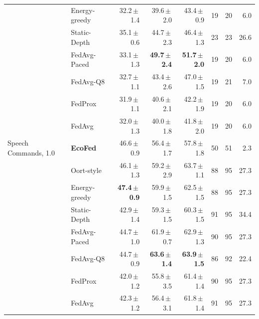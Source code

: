 \begin{tabular}{@{}llrrrrrr@{}}
 & Energy-greedy & 32.2\,$\pm$\,1.4 & 39.6\,$\pm$\,2.0 & 43.4\,$\pm$\,0.9 & 19 & 20 & 6.0\\
 & Static-Depth & 35.1\,$\pm$\,0.6 & 44.7\,$\pm$\,2.3 & 46.4\,$\pm$\,1.3 & 23 & 23 & 26.6\\
 & FedAvg-Paced & 33.1\,$\pm$\,1.3 & \textbf{49.7\,$\pm$\,2.4} & \textbf{51.7\,$\pm$\,2.0} & 19 & 20 & 6.0\\
 & FedAvg-Q8 & 32.7\,$\pm$\,1.1 & 43.4\,$\pm$\,2.6 & 47.0\,$\pm$\,1.5 & 19 & 21 & 7.0\\
 & FedProx & 31.9\,$\pm$\,1.1 & 40.6\,$\pm$\,2.1 & 42.2\,$\pm$\,1.9 & 19 & 20 & 6.0\\
 & FedAvg & 32.0\,$\pm$\,1.3 & 40.0\,$\pm$\,1.8 & 41.8\,$\pm$\,2.0 & 19 & 20 & 6.0\\
\midrule
Speech Commands, 1.0 & \textbf{EcoFed} & 46.6\,$\pm$\,0.9 & 56.4\,$\pm$\,1.7 & 57.8\,$\pm$\,1.8 & 50 & 51 & 2.3\\
 & Oort-style & 46.1\,$\pm$\,1.3 & 59.2\,$\pm$\,2.9 & 63.7\,$\pm$\,1.1 & 88 & 95 & 27.3\\
 & Energy-greedy & \textbf{47.4\,$\pm$\,0.9} & 59.9\,$\pm$\,1.5 & 62.5\,$\pm$\,1.5 & 88 & 95 & 27.3\\
 & Static-Depth & 42.9\,$\pm$\,1.4 & 59.3\,$\pm$\,1.5 & 60.3\,$\pm$\,1.5 & 91 & 95 & 34.4\\
 & FedAvg-Paced & 44.7\,$\pm$\,1.0 & 61.9\,$\pm$\,0.7 & 62.9\,$\pm$\,1.3 & 90 & 95 & 27.3\\
 & FedAvg-Q8 & 44.7\,$\pm$\,0.9 & \textbf{63.6\,$\pm$\,1.4} & \textbf{63.9\,$\pm$\,1.5} & 86 & 92 & 22.4\\
 & FedProx & 42.0\,$\pm$\,1.2 & 55.8\,$\pm$\,3.5 & 61.4\,$\pm$\,1.4 & 90 & 95 & 27.3\\
 & FedAvg & 42.3\,$\pm$\,1.2 & 56.4\,$\pm$\,3.1 & 61.8\,$\pm$\,1.4 & 91 & 95 & 27.3\\
\bottomrule
\end{tabular}